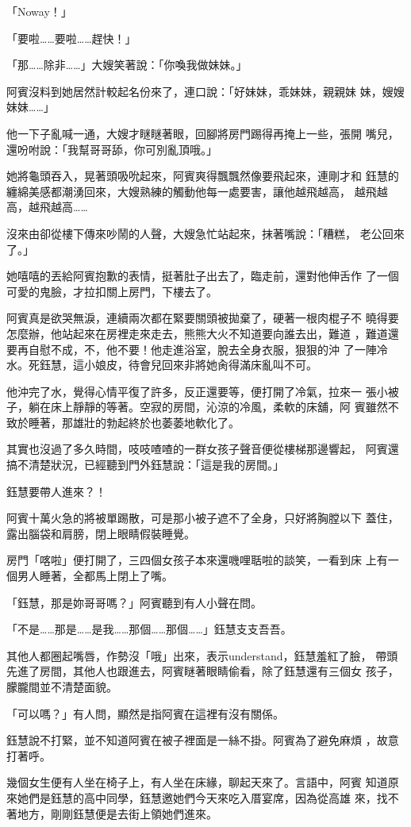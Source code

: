 「Noway！」

「要啦……要啦……趕快！」

「那……除非……」大嫂笑著說：「你喚我做妹妹。」

阿賓沒料到她居然計較起名份來了，連口說：「好妹妹，乖妹妹，親親妹
妹，嫂嫂妹妹……」

他一下子亂喊一通，大嫂才瞇瞇著眼，回腳將房門踢得再掩上一些，張開
嘴兒，還吩咐說：「我幫哥哥舔，你可別亂頂哦。」

她將龜頭吞入，晃著頭吸吮起來，阿賓爽得飄飄然像要飛起來，連剛才和
鈺慧的纏綿美感都潮湧回來，大嫂熟練的觸動他每一處要害，讓他越飛越高，
越飛越高，越飛越高……

沒來由卻從樓下傳來吵鬧的人聲，大嫂急忙站起來，抹著嘴說：「糟糕，
老公回來了。」

她嘻嘻的丟給阿賓抱歉的表情，挺著肚子出去了，臨走前，還對他伸舌作
了一個可愛的鬼臉，才拉扣關上房門，下樓去了。

阿賓真是欲哭無淚，連續兩次都在緊要關頭被拋棄了，硬著一根肉棍子不
曉得要怎麼辦，他站起來在房裡走來走去，熊熊大火不知道要向誰去出，難道
，難道還要再自慰不成，不，他不要！他走進浴室，脫去全身衣服，狠狠的沖
了一陣冷水。死鈺慧，這小娘皮，待會兒回來非將她肏得滿床亂叫不可。

他沖完了水，覺得心情平復了許多，反正還要等，便打開了冷氣，拉來一
張小被子，躺在床上靜靜的等著。空寂的房間，沁涼的冷風，柔軟的床舖，阿
賓雖然不致於睡著，那雄壯的勃起終於也萎萎地軟化了。

其實也沒過了多久時間，吱吱喳喳的一群女孩子聲音便從樓梯那邊響起，
阿賓還搞不清楚狀況，已經聽到門外鈺慧說：「這是我的房間。」

鈺慧要帶人進來？！

阿賓十萬火急的將被單踢散，可是那小被子遮不了全身，只好將胸膛以下
蓋住，露出腦袋和肩膀，閉上眼睛假裝睡覺。

房門「喀啦」便打開了，三四個女孩子本來還嘰哩聒啦的談笑，一看到床
上有一個男人睡著，全都馬上閉上了嘴。

「鈺慧，那是妳哥哥嗎？」阿賓聽到有人小聲在問。

「不是……那是……是我……那個……那個……」鈺慧支支吾吾。

其他人都圈起嘴唇，作勢沒「哦」出來，表示understand，鈺慧羞紅了臉，
帶頭先進了房間，其他人也跟進去，阿賓瞇著眼睛偷看，除了鈺慧還有三個女
孩子，朦朧間並不清楚面貌。

「可以嗎？」有人問，顯然是指阿賓在這裡有沒有關係。

鈺慧說不打緊，並不知道阿賓在被子裡面是一絲不掛。阿賓為了避免麻煩
，故意打著呼。

幾個女生便有人坐在椅子上，有人坐在床緣，聊起天來了。言語中，阿賓
知道原來她們是鈺慧的高中同學，鈺慧邀她們今天來吃入厝宴席，因為從高雄
來，找不著地方，剛剛鈺慧便是去街上領她們進來。

